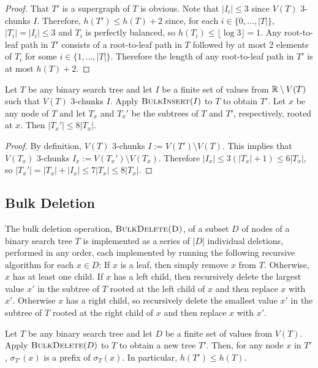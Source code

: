 \documentclass[kpfonts]{patmorin}
\let\le\leqslant
\let\leq\leqslant
\begin{document}
\begin{proof}
  That $T'$ is a supergraph of $T$ is obvious.  Note that $|I_i|\le 3$ since $V(T)$ $3$-chunks $I$.  Therefore, $h(T')\le h(T)+2$ since, for each $i\in\{0,\ldots,|T|\}$, $|T_i|=|I_i|\le 3$ and $T_i$ is perfectly balanced, so $h(T_i)\le\lfloor\log 3\rfloor = 1$.  Any root-to-leaf path in $T'$ consists of a root-to-leaf path in $T$ followed by at most 2 elements of $T_i$ for some $i\in\{1,\ldots,|T|\}$.  Therefore the length of any root-to-leaf path in $T'$ is at most $h(T)+2$.
\end{proof}

\begin{lem}
  Let $T$ be any binary search tree and let $I$ be a finite set of values from $\mathbb{R}\setminus V(T)$ such that
  $V(T)$ $3$-chunks $I$.
  Apply $\textsc{BulkInsert}(I)$ to $T$ to obtain $T'$.
  Let $x$ be any node of $T$ and let $T_x$ and $T_x'$ be the subtrees of $T$ and $T'$, respectively, rooted at $x$.
  Then $|T_x'|\le 8|T_x|$.
\end{lem}

\begin{proof}
  By definition, $V(T)$ 3-chunks $I:=V(T')\setminus V(T)$.  This implies that $V(T_x)$ 3-chunks $I_x:=V(T_x')\setminus V(T_x)$.  Therefore $|I_x|\le 3(|T_x|+1)\le 6|T_x|$, so $|T_x'|=|T_x|+|I_x|\le 7|T_x| \le 8|T_x|$.
\end{proof}


\subsection{Bulk Deletion}

The bulk deletion operation, $\textsc{BulkDelete(D)}$, of a subset $D$ of nodes of a binary search tree $T$ is implemented as a series of $|D|$ individual deletions, performed in any order, each implemented by running the following recursive algorithm for each $x\in D$:  If $x$ is a leaf, then simply remove $x$ from $T$.  Otherwise, $x$ has at least one child.  If $x$ has a left child, then recursively delete the largest value $x'$ in the subtree of $T$ rooted at the left child of $x$ and then replace $x$ with $x'$.  Otherwise $x$ has a right child, so recursively delete the smallest value $x'$ in the subtree of $T$ rooted at the right child of $x$ and then replace $x$ with $x'$.


\begin{lem}
  Let $T$ be any binary search tree and let $D$ be a finite set of values from $V(T)$.
  Apply $\textsc{BulkDelete}(D)$ to $T$ to obtain a new tree $T'$.
  Then, for any node $x$ in $T'$, $\sigma_{T'}(x)$ is a prefix of $\sigma_T(x)$.
  In particular, $h(T')\leq h(T)$.
\end{lem}
\end{document}
